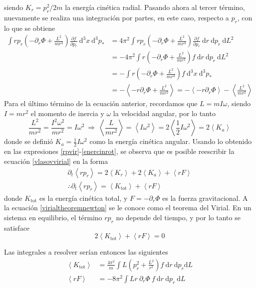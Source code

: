 \documentclass[11pt,twoside,openright,spanish]{report}
\numberwithin{equation}{chapter}
\numberwithin{figure}{chapter}
\numberwithin{table}{chapter}
\begin{document}
siendo $K_r=p_r^2/2m$ la energía cinética radial. Pasando ahora al tercer término, nuevamente se realiza una integración por partes, en este caso, respecto a $p_r$, con lo que se obtiene
\begin{align}
\nonumber
\int rp_r\left(-\partial_r\Phi+\frac{L^2}{mr^3}\right)\frac{\partial f}{\partial p_r}\ \text{d}^3x\ \text{d}^3p_*&=4\pi^2\int rp_r\left(-\partial_r\Phi+\frac{L^2}{mr^3}\right)\frac{\partial f}{\partial p_r}\ \text{d}r\ \text{d}p_r\ \text{d}L^2\\
\nonumber
&=-4\pi^2\int r\left(-\partial_r\Phi+\frac{L^2}{mr^3}\right)f\ \text{d}r\ \text{d}p_r\ \text{d}L^2\\
\nonumber
&=-\int r\left(-\partial_r\Phi+\frac{L^2}{mr^3}\right)f\ \text{d}^3x\ \text{d}^3p_*\\
&=-\left<-r\partial_r\Phi+\frac{L^2}{mr^2}\right>=-\left<-r\partial_r\Phi\right>-\left<\frac{L^2}{mr^2}\right>
\label{potvir}
\end{align}
Para el último término de la ecuación anterior, recordamos que $L=mI\omega$, siendo $I=mr^2$ el momento de inercia y $\omega$ la velocidad angular, por lo tanto
\begin{equation}
\frac{L^2}{mr^2}=\frac{I^2\omega^2}{mr^2}=I\omega^2\ \Rightarrow\ \left<\frac{L}{mr^2}\right>=\left<I\omega^2\right>=2\left<\frac{1}{2}I\omega^2\right>=2\left<K_a\right> 
\label{enercinrot}
\end{equation}
donde se definió $K_a=\frac{1}{2}I\omega^2$ como la energía cinética angular. Usando lo obtenido en las expresiones \eqref{rpvir}-\eqref{enercinrot}, se observa que es posible reescribir la ecuación \eqref{vlasovvirial} en la forma
\begin{eqnarray}
\nonumber
\partial_t\left<rp_r\right>=2\left<K_r\right>+2\left<K_a\right>+\left<rF\right>\\
\therefore \partial_t\left<rp_r\right>=\left<K_{\text{tot}}\right>+\left<rF\right>
\label{virialtheoremnewton}
\end{eqnarray}
donde $K_{\text{tot}}$ es la energía cinética total, y $F=-\partial_r\Phi$ es la fuerza gravitacional. A la ecuación \eqref{virialtheoremnewton} se le conoce como el teorema del Virial. En un sistema en equilibrio, el término $rp_r$ no depende del tiempo, y por lo tanto se satisface
\begin{equation}
2\left<K_{\text{tot}}\right>+\left<rF\right>=0
\end{equation}

Las integrales a resolver serían entonces las siguientes
\begin{align}
\label{K}\left<K_{\text{tot}}\right>&=\frac{4\pi^2}{m}\int L\left(p_r^2+\frac{L^2}{r^2}\right)f\ \text{d}r\ \text{d}p_r \text{d}L\\
\label{rF}
\left<rF\right>&=-8\pi^2\int Lr\ \partial_r\Phi\ f\ \text{d}r\ \text{d}p_r\ \text{d}L
\end{align}
\end{document}
